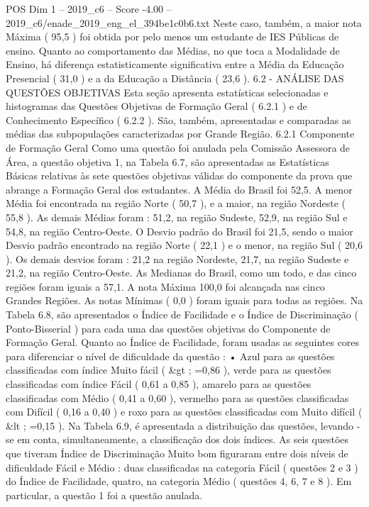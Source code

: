\begin{textsample}{POS Dim 1 – 2019\_c6 – Score -4.00 – 2019\_c6/enade\_2019\_eng\_el\_394be1c0b6.txt}
Neste caso, também, a maior nota Máxima ( 95,5 ) foi obtida por pelo menos um estudante de IES Públicas de ensino.
Quanto ao comportamento das Médias, no que toca a Modalidade de Ensino, há diferença estatisticamente significativa entre a Média da Educação Presencial ( 31,0 ) e a da Educação a Distância ( 23,6 ). 6.2 - ANÁLISE DAS QUESTÕES OBJETIVAS Esta seção apresenta estatísticas selecionadas e histogramas das Questões Objetivas de Formação Geral ( 6.2.1 ) e de Conhecimento Específico ( 6.2.2 ).
São, também, apresentadas e comparadas as médias das subpopulações caracterizadas por Grande Região. 6.2.1 Componente de Formação Geral Como uma questão foi anulada pela Comissão Assessora de Área, a questão objetiva 1, na Tabela 6.7, são apresentadas as Estatísticas Básicas relativas às sete questões objetivas válidas do componente da prova que abrange a Formação Geral dos estudantes.
A Média do Brasil foi 52,5.
A menor Média foi encontrada na região Norte ( 50,7 ), e a maior, na região Nordeste ( 55,8 ).
As demais Médias foram : 51,2, na região Sudeste, 52,9, na região Sul e 54,8, na região Centro-Oeste.
O Desvio padrão do Brasil foi 21,5, sendo o maior Desvio padrão encontrado na região Norte ( 22,1 ) e o menor, na região Sul ( 20,6 ).
Os demais desvios foram : 21,2 na região Nordeste, 21,7, na região Sudeste e 21,2, na região Centro-Oeste.
As Medianas do Brasil, como um todo, e das cinco regiões foram iguais a 57,1.
A nota Máxima 100,0 foi alcançada nas cinco Grandes Regiões.
As notas Mínimas ( 0,0 ) foram iguais para todas as regiões.
Na Tabela 6.8, são apresentados o Índice de Facilidade e o Índice de Discriminação ( Ponto-Bisserial ) para cada uma das questões objetivas do Componente de Formação Geral.
Quanto ao Índice de Facilidade, foram usadas as seguintes cores para diferenciar o nível de dificuldade da questão : • Azul para as questões classificadas com índice Muito fácil ( \&gt ; =0,86 ), verde para as questões classificadas com índice Fácil ( 0,61 a 0,85 ), amarelo para as questões classificadas com Médio ( 0,41 a 0,60 ), vermelho para as questões classificadas com Difícil ( 0,16 a 0,40 ) e roxo para as questões classificadas com Muito difícil ( \&lt ; =0,15 ).
Na Tabela 6.9, é apresentada a distribuição das questões, levando -se em conta, simultaneamente, a classificação dos dois índices.
As seis questões que tiveram Índice de Discriminação Muito bom figuraram entre dois níveis de dificuldade Fácil e Médio : duas classificadas na categoria Fácil ( questões 2 e 3 ) do Índice de Facilidade, quatro, na categoria Médio ( questões 4, 6, 7 e 8 ).
Em particular, a questão 1 foi a questão anulada.

\end{textsample}
